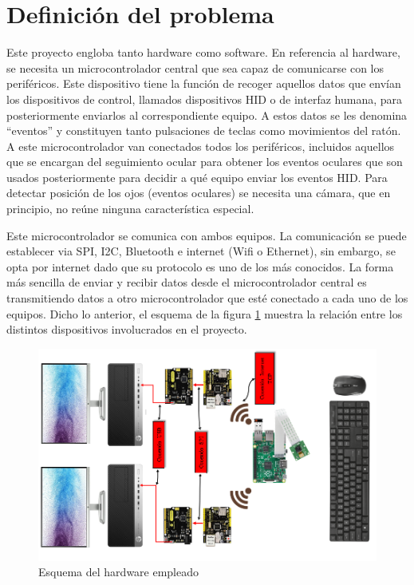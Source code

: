 \section{Definición del problema} \label{s1_3}

Este proyecto engloba tanto hardware como software. En referencia al hardware, se necesita un microcontrolador central que sea capaz de comunicarse con los periféricos. Este dispositivo tiene la función de recoger aquellos datos que envían los dispositivos de control, llamados dispositivos HID o de interfaz humana, para posteriormente enviarlos al correspondiente equipo. A estos datos se les denomina ``eventos'' y constituyen tanto pulsaciones de teclas como movimientos del ratón. A este microcontrolador van conectados todos los periféricos, incluidos aquellos que se encargan del seguimiento ocular para obtener los eventos oculares que son usados posteriormente para decidir a qué equipo enviar los eventos HID. Para detectar posición de los ojos (eventos oculares) se necesita una cámara, que en principio, no reúne ninguna característica especial.

Este microcontrolador se comunica con ambos equipos. La comunicación se puede establecer via SPI, I2C, Bluetooth e internet (Wifi o Ethernet), sin embargo, se opta por internet dado que su protocolo es uno de los más conocidos. La forma más sencilla de enviar y recibir datos desde el microcontrolador central es transmitiendo datos a otro microcontrolador que esté conectado a cada uno de los equipos. Dicho lo anterior, el esquema de la figura \ref{fig:esquemahardware} muestra la relación entre los distintos dispositivos involucrados en el proyecto.

\begin{figure}
\centering
\includegraphics[scale = 0.6, angle=-90]{capitulo_01/figuras_dir/esquemahardware.jpg}
\caption{Esquema del hardware empleado}
\label{fig:esquemahardware}
\end{figure}


